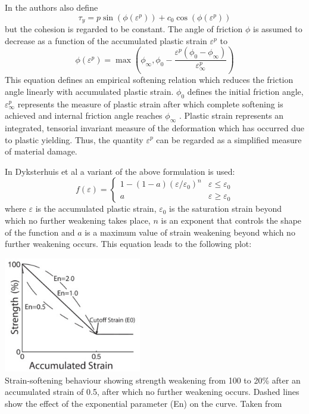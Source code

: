 In \cite{lemh17} the authors also define 
\[
\tau_y = p \sin (\phi(\varepsilon^p))  + c_0 \cos(\phi(\varepsilon^p))
\]
but the cohesion is regarded to be constant. 
The angle of friction $\phi$ is assumed to decrease as a function of the accumulated plastic
strain $\varepsilon^p$ to
\[
\phi(\varepsilon^p) 
=
\max \left(
\phi_\infty , \phi_0 - \frac{\varepsilon^p (\phi_0-\phi_\infty)}{\varepsilon^p_\infty}
\right)
\]
This equation defines an empirical softening relation which reduces the
friction angle linearly with accumulated plastic strain.
$\phi_0$ defines the initial friction angle, $\varepsilon^p_\infty$
represents the measure of plastic strain after which complete softening is achieved and internal
friction angle reaches $\phi_\infty$ . Plastic strain represents an integrated,
tensorial invariant measure of the deformation which has occurred
due to plastic yielding. Thus, the quantity $\varepsilon^p$ can be regarded as
a simplified measure of material damage. 

In Dyksterhuis et al \cite{dyrm07} a variant of the above formulation is used:
\[
f(\varepsilon)=
\left\{
\begin{array}{cc} 
1-(1-a)(\varepsilon/\varepsilon_0)^n & \varepsilon \leq \varepsilon_0 \\
a &  \varepsilon \geq \varepsilon_0 
\end{array}
\right.
\]
where $\varepsilon$ is the accumulated plastic strain, $\varepsilon_0$ is the
saturation strain beyond which no further weakening
takes place, $n$ is an exponent that controls the shape
of the function and $a$ is a maximum value of strain
weakening beyond which no further weakening
occurs. This equation leads to the following plot:

\begin{center}
\includegraphics[width=6cm]{images/strainweakening/dyrm07}\\
{\tiny Strain-softening behaviour showing strength weakening from 100 to 20\% 
after an accumulated strain of 0.5, after which no further weakening occurs. 
Dashed lines show the effect of the exponential parameter
(En) on the curve. Taken from \cite{dyrm07}}
\end{center}

